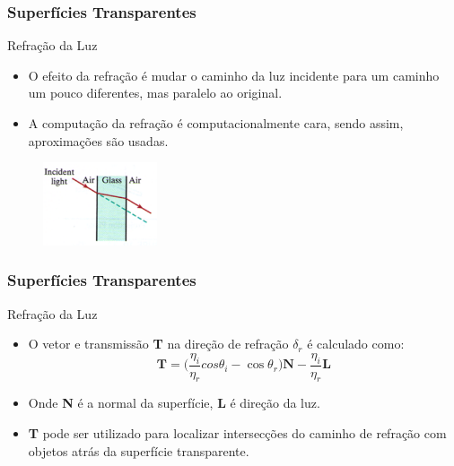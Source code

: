 \documentclass{beamer}
\begin{document}
\begin{frame}
\frametitle{Superfícies Transparentes}

	\begin{block}{Refração da Luz}
		\begin{itemize}
			\item O efeito da refração é mudar o caminho da luz incidente para um caminho um pouco diferentes, mas paralelo ao original.
			\item A computação da refração é computacionalmente cara, sendo assim, aproximações são usadas.
		\end{itemize}
	\end{block}
	
	\begin{figure}[!h]
		\begin{center}
		\includegraphics[width=0.3\textwidth]{Figures/Ref}
		\end{center}
	\end{figure}	
\end{frame}


\begin{frame}
\frametitle{Superfícies Transparentes}

	\begin{block}{Refração da Luz}
		\begin{itemize}
			\item O vetor e transmissão \textbf{T} na direção de refração $\delta_r$ é calculado como:
			\begin{equation*}
				\textbf{T} =\bigg( \frac{\eta_i}{\eta_r}cos \theta_i - \cos \theta_r \bigg) \textbf{N} - \frac{\eta_i}{\eta_r}\textbf{L}
			\end{equation*}
			\item Onde \textbf{N} é a normal da superfície, \textbf{L} é direção da luz.
			\item \textbf{T} pode ser utilizado para localizar intersecções do caminho de refração com objetos atrás da superfície transparente.
		\end{itemize}
	\end{block}
\end{frame}
\end{document}
